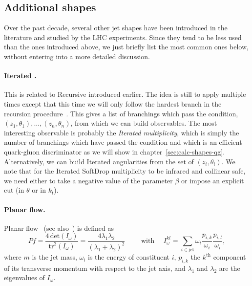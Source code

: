 \subsection{Additional shapes}\label{sec:def-other-shapes}

Over the past decade, several other jet shapes have been introduced in
the literature and studied by the LHC experiments. Since they tend to
be less used than the ones introduced above, we just briefly list the
most common ones below, without entering into a more detailed
discussion.

\paragraph{Iterated \SD.} This is related to Recursive \SD
introduced earlier. The idea is still to apply \SD multiple
times except that this time we will only follow the hardest branch in
the recursion procedure~\cite{Frye:2017yrw}. This gives a list of
branchings which pass the \SD condition,
$(z_1,\theta_1), \dots, (z_n,\theta_n)$, from which we can build
observables. The most interesting observable is probably the {\em
  Iterated \SD multiplicity}, which is simply the number of branchings
which have passed the \SD condition and which is an efficient
quark-gluon discriminator as we will show in
chapter~\ref{sec:calc-shapes-qg}.
%
Alternatively, we can build Iterated \SD angularities from the set of
$(z_i,\theta_i)$.
%
We note that for the Iterated SoftDrop multiplicity to be infrared
and collinear safe, we need either to take a negative value of the \SD
parameter $\beta$ or impose an explicit cut (in $\theta$ or in $k_t$).

\paragraph{Planar flow.} Planar flow~\cite{Almeida:2008yp} (see also~\cite{Thaler:2008ju}) is defined as
\begin{equation}
  Pf = \frac{4\,\text{det}(I_\omega)}{\text{tr}^2(I_\omega)}
     = \frac{4\lambda_1\lambda_2}{(\lambda_1 + \lambda_2)^2}
  \qquad\text{ with }\quad
  I_\omega^{kl}  =  \sum_{i\in \text{jet}}
                  \omega_i \frac{p_{i,k}}{\omega_i} \frac{p_{i,l}}{\omega_i},
\end{equation}
where $m$ is the jet mass, $\omega_i$ is the energy of constituent $i$,
$p_{i,k}$ the $k^{\text{th}}$ component of its transverse momentum
with respect to the jet axis, and $\lambda_1$ and $\lambda_2$ are the eigenvalues
of $I_\omega$.

